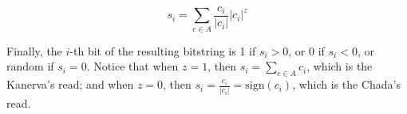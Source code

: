 $$
s_i = \sum_{c \in A} \frac{c_i}{|c_i|} |c_i|^z
$$

Finally, the $i$-th bit of the resulting bitstring is 1 if $s_i > 0$, or 0 if $s_i < 0$, or random if $s_i = 0$. Notice that when $z=1$, then $s_i = \sum_{c \in A} c_i$, which is the Kanerva's read; and when $z=0$, then $s_i = \frac{c_i}{|c_i|} = \text{sign}(c_i)$, which is the Chada's read.

\begin{table}
\begin{minipage}[t]{0.5\columnwidth}%
%
\end{minipage}%
\begin{minipage}[t]{0.5\columnwidth}%
%
\end{minipage}\caption{Comparison of Kanerva's read and Chada's read. Each $\xi_{i}$ is
an activated hard-location and the values come from their counters.
Gray cells' value is obtained randomly with probability 50\%.\label{tab:read-operation}}
\end{table}


